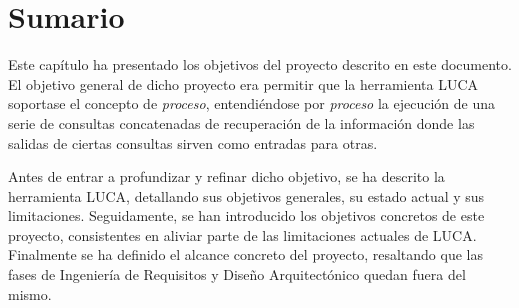 
\section{Sumario}

Este capítulo ha presentado los objetivos del proyecto descrito en este documento. El objetivo general de dicho proyecto era permitir que la herramienta LUCA soportase el concepto de \emph{proceso}, entendiéndose por \emph{proceso} la ejecución de una serie de consultas concatenadas de recuperación de la información donde las salidas de ciertas consultas sirven como entradas para otras. 

Antes de entrar a profundizar y refinar dicho objetivo, se ha descrito la herramienta LUCA, detallando sus objetivos generales, su estado actual y sus limitaciones. Seguidamente, se han introducido los objetivos concretos de este proyecto, consistentes en aliviar parte de las limitaciones actuales de LUCA. Finalmente se ha definido el alcance concreto del proyecto, resaltando que las fases de Ingeniería de Requisitos y Diseño Arquitectónico quedan fuera del mismo.